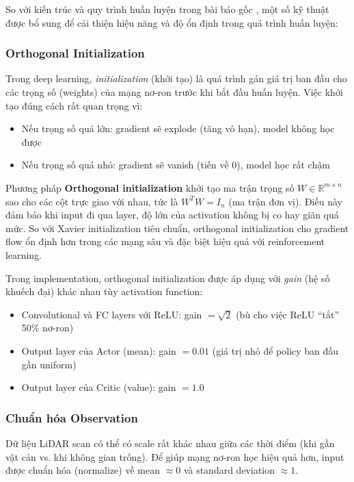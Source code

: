 So với kiến trúc và quy trình huấn luyện trong bài báo gốc \cite{long2018towards}, một số kỹ thuật được bổ sung để cải thiện hiệu năng và độ ổn định trong quá trình huấn luyện:

\subsubsection{Orthogonal Initialization}

Trong deep learning, \textit{initialization} (khởi tạo) là quá trình gán giá trị ban đầu cho các trọng số (weights) của mạng nơ-ron trước khi bắt đầu huấn luyện. Việc khởi tạo đúng cách rất quan trọng vì:
\begin{itemize}[nosep]
\item Nếu trọng số quá lớn: gradient sẽ explode (tăng vô hạn), model không học được
\item Nếu trọng số quá nhỏ: gradient sẽ vanish (tiến về 0), model học rất chậm
\end{itemize}

Phương pháp \textbf{Orthogonal initialization} khởi tạo ma trận trọng số $W \in \mathbb{R}^{m \times n}$ sao cho các cột trực giao với nhau, tức là $W^T W = I_n$ (ma trận đơn vị). Điều này đảm bảo khi input đi qua layer, độ lớn của activation không bị co hay giãn quá mức. So với Xavier initialization tiêu chuẩn, orthogonal initialization cho gradient flow ổn định hơn trong các mạng sâu và đặc biệt hiệu quả với reinforcement learning.

Trong implementation, orthogonal initialization được áp dụng với \textit{gain} (hệ số khuếch đại) khác nhau tùy activation function:
\begin{itemize}[nosep]
\item Convolutional và FC layers với ReLU: gain $= \sqrt{2}$ (bù cho việc ReLU ``tắt'' 50\% nơ-ron)
\item Output layer của Actor (mean): gain $= 0.01$ (giá trị nhỏ để policy ban đầu gần uniform)
\item Output layer của Critic (value): gain $= 1.0$
\end{itemize}

\subsubsection{Chuẩn hóa Observation}

Dữ liệu LiDAR scan có thể có scale rất khác nhau giữa các thời điểm (khi gần vật cản vs. khi không gian trống). Để giúp mạng nơ-ron học hiệu quả hơn, input được chuẩn hóa (normalize) về mean $\approx 0$ và standard deviation $\approx 1$.

